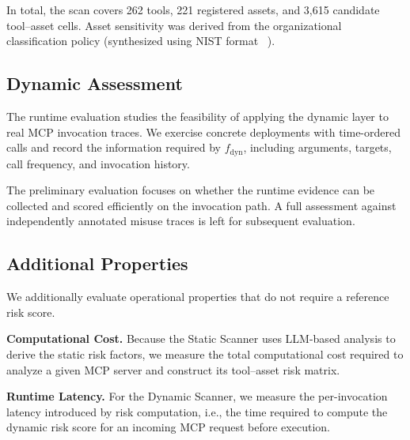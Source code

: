 \documentclass[sigconf]{acmart}
\begin{document}
In total, the scan covers 262 tools, 221 registered assets, and
3,615 candidate tool--asset cells. Asset sensitivity was derived from
the organizational classification policy (synthesized using NIST format ~\cite{nist2008sp80060}).


\subsection{Dynamic Assessment}
\label{sec:dynamic-eval}

The runtime evaluation studies the feasibility of applying the dynamic layer
to real MCP invocation traces. We exercise concrete deployments with
time-ordered calls and record the information required by
$f_{\mathrm{dyn}}$, including arguments, targets, call frequency, and
invocation history.

The preliminary evaluation focuses on whether the runtime evidence can be
collected and scored efficiently on the invocation path. A full assessment
against independently annotated misuse traces is left for subsequent
evaluation.


\subsection{Additional Properties}
\label{sec:operational-eval}

We additionally evaluate operational properties that do not require a reference risk score.

\textbf{Computational Cost.}
Because the Static Scanner uses LLM-based analysis to derive the static risk factors, we measure the total computational cost required to analyze a given MCP server and construct its tool--asset risk matrix.

\textbf{Runtime Latency.}
For the Dynamic Scanner, we measure the per-invocation latency introduced by risk computation, i.e., the time required to compute the dynamic risk score for an incoming MCP request before execution.



\end{document}
